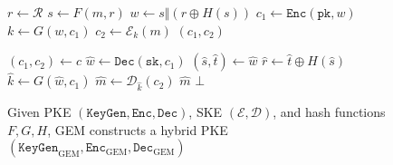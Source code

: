 \documentclass[runningheads]{llncs}
\newcommand{\keygen}{\texttt{KeyGen}}
\newcommand{\encrypt}{\texttt{Enc}}
\newcommand{\decrypt}{\texttt{Dec}}
\newcommand{\pk}{\texttt{pk}}
\newcommand{\sk}{\texttt{sk}}
\begin{document}
\begin{figure}[h]
    \centering
    \begin{minipage}[t]{0.45\textwidth}
        \begin{algorithm}[H]
            \caption*{$\encrypt_\text{GEM}(\pk, m)$}
            \begin{algorithmic}[1]
                \State $r \leftarrow \mathcal{R}$
                \State $s \leftarrow F(m, r)$
                \State $w \leftarrow s \Vert (r \oplus H(s))$
                \State $c_1 \leftarrow \encrypt(\pk, w)$
                \State $k \leftarrow G(w, c_1)$
                \State $c_2 \leftarrow \mathcal{E}_k(m)$
                \State \Return $(c_1, c_2)$
            \end{algorithmic}
        \end{algorithm}
    \end{minipage}
    \begin{minipage}[t]{0.45\textwidth}
        \begin{algorithm}[H]
            \caption*{$\decrypt_\text{GEM}(\sk, c)$}
            \begin{algorithmic}[1]
                \Require $(c_1, c_2) \leftarrow c$
                \State $\hat{w} \leftarrow \decrypt(\sk, c_1)$
                \State $(\hat{s}, \hat{t}) \leftarrow \hat{w}$
                \State $\hat{r} \leftarrow \hat{t}\oplus H(\hat{s})$
                \State $\hat{k} \leftarrow G(\hat{w}, c_1)$
                \State $\hat{m} \leftarrow \mathcal{D}_{\hat{k}}(c_2)$
                    \State \Return $\hat{m}$
                \Else \State \Return $\bot$
                \EndIf
            \end{algorithmic}
        \end{algorithm}
    \end{minipage}
    \caption{Given PKE $(\keygen, \encrypt, \decrypt)$, SKE $(\mathcal{E}, \mathcal{D})$, and hash functions $F, G, H$, GEM constructs a hybrid PKE $(\keygen_\text{GEM}, \encrypt_\text{GEM}, \decrypt_\text{GEM})$}\label{fig:gem}
\end{figure}
\end{document}
